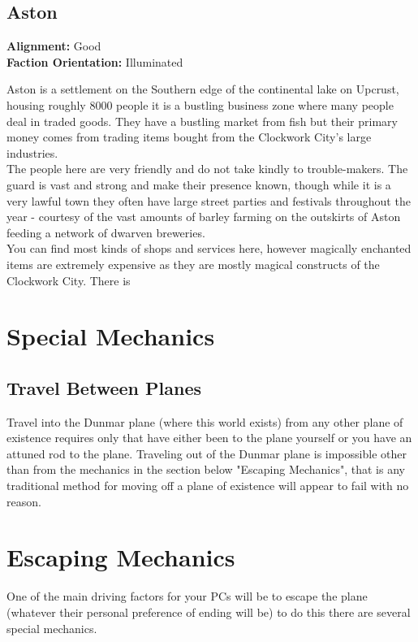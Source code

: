 \documentclass[10pt,twoside,twocolumn]{article}
\begin{document}
\subsection{Aston}
\textbf{Alignment:} Good \\
\textbf{Faction Orientation:} Illuminated\\
\begin{quotebox}
	Aston is a settlement on the Southern edge of the continental lake on Upcrust, housing roughly 8000 people it is a bustling business zone where many people deal in traded goods. They have a bustling market from fish but their primary money comes from trading items bought from the Clockwork City's large industries.\\

	The people here are very friendly and do not take kindly to trouble-makers. The guard is vast and strong and make their presence known, though while it is a very lawful town they often have large street parties and festivals throughout the year - courtesy of the vast amounts of barley farming on the outskirts of Aston feeding a network of dwarven breweries.\\

	You can find most kinds of shops and services here, however magically enchanted items are extremely expensive as they are mostly magical constructs of the Clockwork City. There is 
\end{quotebox}

\section{Special Mechanics}

\subsection{Travel Between Planes}
Travel into the Dunmar plane (where this world exists) from any other plane of existence requires only that have either been to the plane yourself or you have an attuned rod to the plane. Traveling out of the Dunmar plane is impossible other than from the mechanics in the section below "Escaping Mechanics", that is any traditional method for moving off a plane of existence will appear to fail with no reason.\\

\section{Escaping Mechanics}
One of the main driving factors for your PCs will be to escape the plane (whatever their personal preference of ending will be) to do this there are several special mechanics.\\
\end{document}
